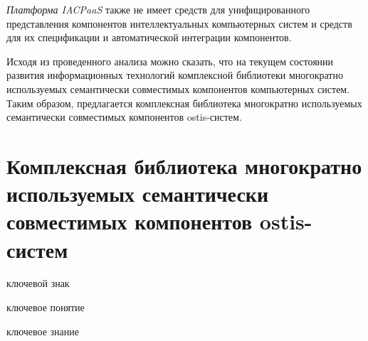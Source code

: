 \textit{Платформа IACPaaS} также не имеет средств для унифицированного представления компонентов интеллектуальных компьютерных систем и средств для их спецификации и автоматической интеграции компонентов.

Исходя из проведенного анализа можно сказать, что на текущем состоянии развития информационных технологий  комплексной библиотеки многократно используемых семантически совместимых компонентов компьютерных систем. Таким образом, предлагается комплексная библиотека многократно используемых семантически совместимых компонентов ostis-систем.

\section{Комплексная библиотека многократно используемых семантически совместимых компонентов ostis-систем}
\label{ostis_library_section}

\begin{SCn}
\begin{scnrelfromlist}{ключевой знак}
\end{scnrelfromlist}
\end{SCn}

\begin{SCn}
\begin{scnrelfromlist}{ключевое понятие}
\end{scnrelfromlist}
\end{SCn}

\begin{SCn}
\begin{scnrelfromlist}{ключевое знание}
\end{scnrelfromlist}
\end{SCn}

\bigskip

